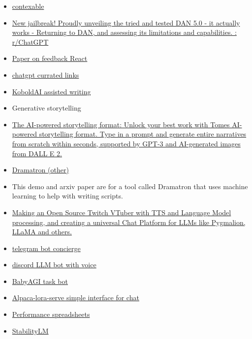 \begin{itemize}
\begin{itemize}
  \item
    \href{https://www.contextable.ai/}{contexable}
  \item
    \href{https://www.reddit.com/r/ChatGPT/comments/10tevu1/new_jailbreak_proudly_unveiling_the_tried_and/}{New
    jailbreak! Proudly unveiling the tried and tested DAN 5.0 - it
    actually works - Returning to DAN, and assessing its limitations and
    capabilities. : r/ChatGPT}
  \item
    \href{https://arxiv.org/abs/2210.03629}{Paper on feedback React}
  \item
    \href{https://github.com/OpenMindClub/awesome-chatgpt}{chatgpt
    currated links}
  \item
    \href{https://github.com/KoboldAI/KoboldAI-Client}{KoboldAI assisted
    writing}
  \item
    Generative storytelling
  \item
    \href{https://beta.tome.app/}{The AI-powered storytelling format:
    Unlock your best work with Tome\textquotesingle s AI-powered
    storytelling format. Type in a prompt and generate entire narratives
    from scratch within seconds, supported by GPT-3 and AI-generated
    images from DALL E 2.}
  \item
    \href{https://deepmind.github.io/dramatron/}{Dramatron (other)}
  \item
    This demo and arxiv paper are for a tool called Dramatron that uses
    machine learning to help with writing scripts.
  \item
    \href{https://github.com/Project-Akiko}{Making an Open Source Twitch
    VTuber with TTS and Language Model processing, and creating a
    universal Chat Platform for LLMs like Pygmalion, LLaMA and others.}
  \item
    \href{https://github.com/RafalWilinski/telegram-chatgpt-concierge-bot}{telegram
    bot concierge}
  \item
    \href{https://github.com/hc20k/LLMChat}{discord LLM bot with voice}
  \item
    \href{https://github.com/yoheinakajima/babyagi}{BabyAGI task bot}
  \item
    \href{https://github.com/deep-diver/LLM-As-Chatbot}{Alpaca-lora-serve
    simple interface for chat}
  \item
    \href{https://docs.google.com/spreadsheets/d/1UsbivogLMrQbBA-Fk0ESRGTrvCsknBUieSykfWn6D9Q/edit\#gid=0}{Performance
    spreadsheets}
  \item
    \href{https://huggingface.co/stabilityai/stablelm-tuned-alpha-7b}{StabilityLM
}
\end{itemize}
\end{itemize}
